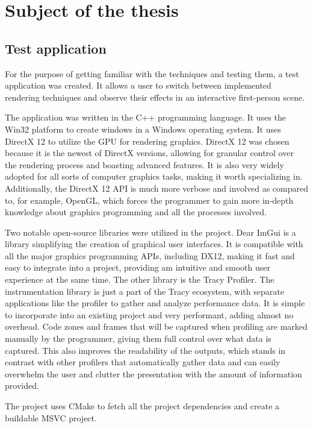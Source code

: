 \chapter{Subject of the thesis}
\label{chapter:3_subject}

\section{Test application}
\label{chapter:3_test_app}
For the purpose of getting familiar with the techniques and testing them, a test application was created. It allows a user to switch between implemented rendering techniques and observe their effects in an interactive first-person scene.

The application was written in the C++ programming language. It uses the Win32 platform to create windows in a Windows operating system. It uses DirectX 12 to utilize the GPU for rendering graphics. DirectX 12 was chosen because it is the newest of DirectX versions, allowing for granular control over the rendering process and boasting advanced features. It is also very widely adopted for all sorts of computer graphics tasks, making it worth specializing in. Additionally, the DirectX 12 API is much more verbose and involved as compared to, for example, OpenGL, which forces the programmer to gain more in-depth knowledge about graphics programming and all the processes involved.

Two notable open-source libraries were utilized in the project. Dear ImGui is a library simplifying the creation of graphical user interfaces. It is compatible with all the major graphics programming APIs, including DX12, making it fast and easy to integrate into a project, providing am intuitive and smooth user experience at the same time. The other library is the Tracy Profiler. The instrumentation library is just a part of the Tracy ecosystem, with separate applications like the profiler to gather and analyze performance data. It is simple to incorporate into an existing project and very performant, adding almost no overhead. Code zones and frames that will be captured when profiling are marked manually by the programmer, giving them full control over what data is captured. This also improves the readability of the outputs, which stands in contrast with other profilers that automatically gather data and can easily overwhelm the user and clutter the presentation with the amount of information provided.

The project uses CMake to fetch all the project dependencies and create a buildable MSVC project.

